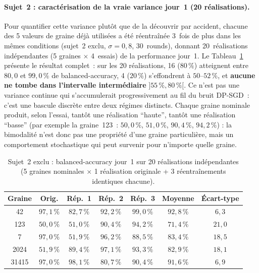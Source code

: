 \documentclass{acmart}
\begin{document}
\paragraph{Sujet~2 : caractérisation de la vraie variance jour~1 (20
réalisations).} Pour quantifier cette variance plutôt que de la découvrir
par accident, chacune des 5 valeurs de graine déjà utilisées a été
réentraînée 3~fois de plus dans les mêmes conditions (sujet~2 exclu,
$\sigma=0{,}8$, 30~rounds), donnant 20~réalisations indépendantes (5 graines
$\times$ 4~essais) de la performance jour~1. Le
Tableau~\ref{tab:seed_variance} présente le résultat complet~: sur les 20
réalisations, 16 ($80\,\%$) atteignent entre $80{,}0$ et $99{,}0\,\%$ de
balanced-accuracy, 4 ($20\,\%$) s'effondrent à $50$--$52\,\%$, et
\textbf{aucune ne tombe dans l'intervalle intermédiaire} $]55\,\%,
80\,\%[$. Ce n'est pas une variance continue qui s'accumulerait
progressivement au fil du bruit DP-SGD~: c'est une bascule discrète entre
deux régimes distincts. Chaque graine nominale produit, selon
l'essai, tantôt une réalisation ``haute'', tantôt une réalisation
``basse'' (par exemple la graine~123~: $50{,}0\,\%$, $51{,}0\,\%$,
$90{,}4\,\%$, $94{,}2\,\%$) : la bimodalité n'est donc pas une propriété
d'une graine particulière, mais un comportement stochastique qui peut
survenir pour n'importe quelle graine.

\begin{table}[h!]
  \centering
  \small
  \caption{Sujet~2 exclu : balanced-accuracy jour~1 sur 20 réalisations
  indépendantes (5 graines nominales $\times$ 1 réalisation originale + 3
  réentraînements identiques chacune).}
  \label{tab:seed_variance}
  \begin{tabular}{ccccccc}
    \toprule
    Graine & Orig. & Rép.~1 & Rép.~2 & Rép.~3 & Moyenne & Écart-type \\
    \midrule
    42    & $97{,}1\,\%$ & $82{,}7\,\%$ & $92{,}2\,\%$ & $99{,}0\,\%$ & $92{,}8\,\%$ & $6{,}3$ \\
    123   & $50{,}0\,\%$ & $51{,}0\,\%$ & $90{,}4\,\%$ & $94{,}2\,\%$ & $71{,}4\,\%$ & $21{,}0$ \\
    7     & $97{,}0\,\%$ & $51{,}9\,\%$ & $96{,}2\,\%$ & $88{,}5\,\%$ & $83{,}4\,\%$ & $18{,}5$ \\
    2024  & $51{,}9\,\%$ & $89{,}4\,\%$ & $97{,}1\,\%$ & $93{,}3\,\%$ & $82{,}9\,\%$ & $18{,}1$ \\
    31415 & $97{,}0\,\%$ & $98{,}1\,\%$ & $80{,}7\,\%$ & $90{,}4\,\%$ & $91{,}6\,\%$ & $6{,}9$ \\
    \bottomrule
  \end{tabular}
\end{table}
\end{document}

